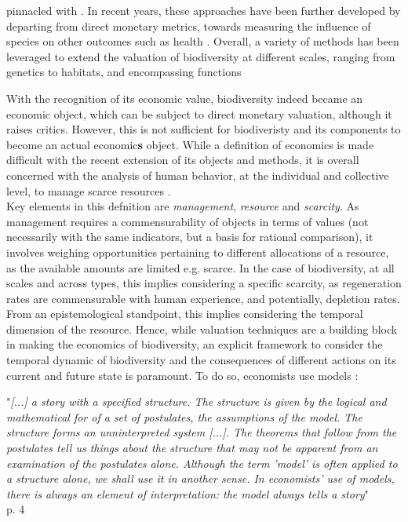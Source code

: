 pinnacled with \cite{Costanza1997}. In recent years, these approaches have been further developed by departing from direct monetary metrics, towards measuring the influence of species on other outcomes such as health \citep{frank_social_nodate,frank_economic_2024}. Overall, a variety of methods has been leveraged to extend the valuation of biodiversity at different scales, ranging from genetics to habitats, and encompassing functions \citep{bartkowski_capturing_2015}

With the recognition of its economic value, biodiversity indeed became an economic object, which can be subject to direct monetary valuation, although it raises critics. However, this is not sufficient for biodiveristy and its components to become an actual economic\textbf{s} object. While a definition of economics is made difficult with the recent extension of its objects and methods, it is overall concerned with the analysis of human behavior, at the individual and collective level, to manage scarce resources \citep{mankiw_principles_2011, bade_foundations_2002,backhouse_retrospectives_2009}.\\
Key elements in this defnition are \textit{management}, \textit{resource }and \textit{scarcity}. As management requires a commensurability of objects in terms of values (not necessarily with the same indicators, but a basis for rational comparison), it involves weighing opportunities pertaining to different allocations of a resource, as the available amounts are limited e.g. scarce. In the case of biodiversity, at all scales and across types, this implies considering a specific scarcity, as regeneration rates are commensurable with human experience, and potentially, depletion rates. From an epistemological standpoint, this implies considering the temporal dimension of the resource. Hence, while valuation techniques are a building block in making the economics of biodiversity, an explicit framework to consider the temporal dynamic of biodiversity and the consequences of different actions on its current and future state is paramount. To do so, economists use models : 

\begin{displayquote}
 "\textit{[...] a story with a specified structure. The structure is given by the logical and mathematical for of a set of postulates, the assumptions of the model. The structure forms an unninterpreted system [...]. The theorems that follow from the postulates tell us things about the structure that may not be apparent from an examination of the postulates alone. Although the term 'model' is often applied to a structure alone, we shall use it in another sense. In economists' use of models, there is always an element of interpretation: the model always tells a story}"\\
\hspace*{\fill} \small{\cite{GibbardVarian} p. 4}
\end{displayquote}

